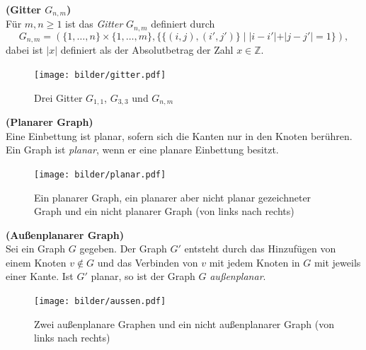 \newpage
\begin{defi}{\textbf{(Gitter $G_{n,m}$)}}\\
Für $m,n \geq 1$ ist das \emph{Gitter} $G_{n,m}$ definiert durch $$G_{n,m}=(\{1,\ldots,n\}\times\{1,\ldots ,m\},\{\{(i,j),(i',j')\}\;|\;|i-i'|+|j-j'|=1\} ),$$ dabei ist $|x|$ definiert als der Absolutbetrag der Zahl $x \in \mathbb{Z}$.\cite{buchwanke} 
\end{defi}
\vspace{-4mm}
\begin{figure}[h!]
		\centering 		 
   \texttt{[image: bilder/gitter.pdf]}
	\caption{Drei Gitter $G_{1,1}$, $G_{3,3}$ und $G_{n,m}$}
  	 \end{figure}

\begin{defi}{\textbf{(Planarer Graph)}}\\
Eine Einbettung ist planar, sofern sich die Kanten nur in den Knoten berühren.\newline
Ein Graph ist \emph{planar}, wenn er eine planare Einbettung besitzt.
\end{defi}

\begin{figure}[h!]
		\centering 		 
   \texttt{[image: bilder/planar.pdf]}
	\caption{Ein planarer Graph, ein planarer aber nicht planar gezeichneter Graph und ein nicht planarer Graph (von links nach rechts)}
  	 \end{figure}


\begin{defi}{\textbf{(Außenplanarer Graph)}}\\
Sei ein Graph $G$ gegeben. Der Graph $G'$ entsteht durch das Hinzufügen von einem Knoten $v \notin G$ und das Verbinden von $v$ mit jedem Knoten in $G$ mit jeweils einer Kante. Ist $G'$ planar, so ist der Graph $G$ \emph{außenplanar}. 
\end{defi}
\begin{figure}[h!]
		\centering 		 
   \texttt{[image: bilder/aussen.pdf]}
	\caption{Zwei außenplanare Graphen und ein nicht außenplanarer Graph (von links nach rechts)}
  	 \end{figure}

\newpage
